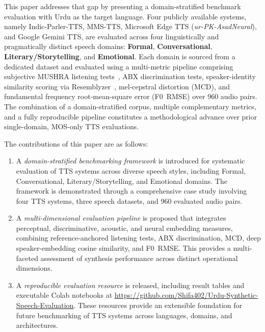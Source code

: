 \documentclass[a4paper,fleqn]{cas-dc}
\begin{document}
    This paper addresses that gap by presenting a domain-stratified benchmark evaluation with Urdu as the target language. Four publicly available systems, namely Indic-Parler-TTS, MMS-TTS, Microsoft Edge TTS (\textit{ur-PK-AsadNeural}), and Google Gemini TTS, are evaluated across four linguistically and pragmatically distinct speech domains: \textbf{Formal}, \textbf{Conversational}, \textbf{Literary/Storytelling}, and \textbf{Emotional}. Each domain is sourced from a dedicated dataset and evaluated using a multi-metric pipeline comprising subjective MUSHRA listening tests~\citep{itu2015mushra}, ABX discrimination tests, speaker-identity similarity scoring via Resemblyzer~\citep{wan2018ge2e}, mel-cepstral distortion (MCD), and fundamental frequency root-mean-square error (F0~RMSE) over 960 audio pairs. The combination of a domain-stratified corpus, multiple complementary metrics, and a fully reproducible pipeline constitutes a methodological advance over prior single-domain, MOS-only TTS evaluations.


    The contributions of this paper are as follows:

\begin{enumerate}

    \item A \emph{domain-stratified benchmarking framework} is introduced for systematic evaluation of TTS systems across diverse speech styles, including Formal, Conversational, Literary/Storytelling, and Emotional domains. The framework is demonstrated through a comprehensive case study involving four TTS systems, three speech datasets, and 960 evaluated audio pairs.

    \item A \emph{multi-dimensional evaluation pipeline} is proposed that integrates perceptual, discriminative, acoustic, and neural embedding measures, combining reference-anchored listening tests, ABX discrimination, MCD, deep speaker-embedding cosine similarity, and F0~RMSE. This provides a multi-faceted assessment of synthesis performance across distinct operational dimensions.

    \item A \emph{reproducible evaluation resource} is released, including result tables and executable Colab notebooks at \url{https://github.com/Shifa402/Urdu-Synthetic-Speech-Evaluation}. These resources provide an extensible foundation for future benchmarking of TTS systems across languages, domains, and architectures.

\end{enumerate}
 
\end{document}
